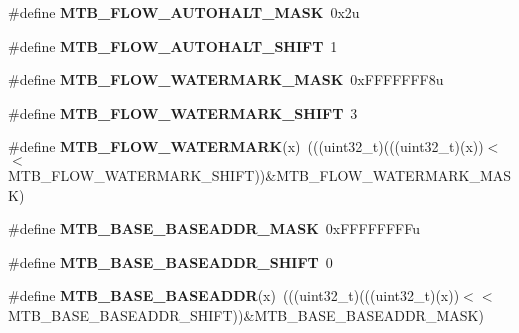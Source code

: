 \begin{DoxyCompactItemize}
\#define {\bfseries M\+T\+B\+\_\+\+F\+L\+O\+W\+\_\+\+A\+U\+T\+O\+H\+A\+L\+T\+\_\+\+M\+A\+SK}~0x2u
\item 
\mbox{\label{group___m_t_b___register___masks_ga6791ae220dbaca3c5866b664c56c0b56}} 
\#define {\bfseries M\+T\+B\+\_\+\+F\+L\+O\+W\+\_\+\+A\+U\+T\+O\+H\+A\+L\+T\+\_\+\+S\+H\+I\+FT}~1
\item 
\mbox{\label{group___m_t_b___register___masks_ga381f94c6e6980a65bb9fbc594dd688bd}} 
\#define {\bfseries M\+T\+B\+\_\+\+F\+L\+O\+W\+\_\+\+W\+A\+T\+E\+R\+M\+A\+R\+K\+\_\+\+M\+A\+SK}~0x\+F\+F\+F\+F\+F\+F\+F8u
\item 
\mbox{\label{group___m_t_b___register___masks_ga0307292719da2a56557ce153eada2315}} 
\#define {\bfseries M\+T\+B\+\_\+\+F\+L\+O\+W\+\_\+\+W\+A\+T\+E\+R\+M\+A\+R\+K\+\_\+\+S\+H\+I\+FT}~3
\item 
\mbox{\label{group___m_t_b___register___masks_gab88d4a36c552161249e11b5f0a1843cf}} 
\#define {\bfseries M\+T\+B\+\_\+\+F\+L\+O\+W\+\_\+\+W\+A\+T\+E\+R\+M\+A\+RK}(x)~(((uint32\+\_\+t)(((uint32\+\_\+t)(x))$<$$<$M\+T\+B\+\_\+\+F\+L\+O\+W\+\_\+\+W\+A\+T\+E\+R\+M\+A\+R\+K\+\_\+\+S\+H\+I\+FT))\&M\+T\+B\+\_\+\+F\+L\+O\+W\+\_\+\+W\+A\+T\+E\+R\+M\+A\+R\+K\+\_\+\+M\+A\+SK)
\item 
\mbox{\label{group___m_t_b___register___masks_ga9aabef14f0b7a38e25f049f289273193}} 
\#define {\bfseries M\+T\+B\+\_\+\+B\+A\+S\+E\+\_\+\+B\+A\+S\+E\+A\+D\+D\+R\+\_\+\+M\+A\+SK}~0x\+F\+F\+F\+F\+F\+F\+F\+Fu
\item 
\mbox{\label{group___m_t_b___register___masks_gaaa4c5bd3736221b3c88252a206a4b716}} 
\#define {\bfseries M\+T\+B\+\_\+\+B\+A\+S\+E\+\_\+\+B\+A\+S\+E\+A\+D\+D\+R\+\_\+\+S\+H\+I\+FT}~0
\item 
\mbox{\label{group___m_t_b___register___masks_gade2bba1592e9c02f0696a12e98e48736}} 
\#define {\bfseries M\+T\+B\+\_\+\+B\+A\+S\+E\+\_\+\+B\+A\+S\+E\+A\+D\+DR}(x)~(((uint32\+\_\+t)(((uint32\+\_\+t)(x))$<$$<$M\+T\+B\+\_\+\+B\+A\+S\+E\+\_\+\+B\+A\+S\+E\+A\+D\+D\+R\+\_\+\+S\+H\+I\+FT))\&M\+T\+B\+\_\+\+B\+A\+S\+E\+\_\+\+B\+A\+S\+E\+A\+D\+D\+R\+\_\+\+M\+A\+SK)

\end{DoxyCompactItemize}
